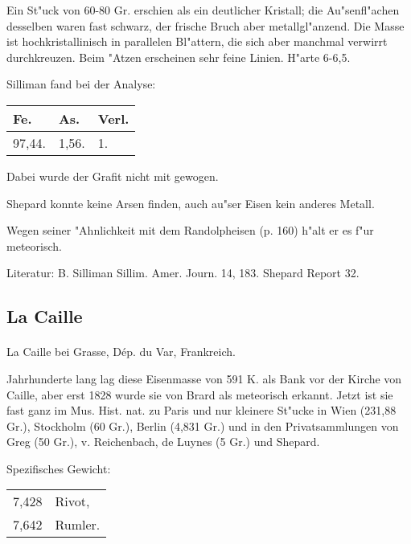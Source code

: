 \documentclass[a4paper, 11pt, oneside]{article}
\begin{document}
Ein St"uck von 60-80 Gr. erschien als ein deutlicher Kristall; die Au"senfl"achen desselben waren fast schwarz, der frische Bruch aber metallgl"anzend. Die Masse ist hochkristallinisch in parallelen Bl"attern, die sich aber manchmal verwirrt durchkreuzen. Beim "Atzen erscheinen sehr feine Linien. H"arte 6-6,5.

Silliman fand bei der Analyse:
\begin{table}[H]
    \centering
    \begin{tabular}{l l l}
        Fe. & As. & Verl. \\ \hline
        97,44. & 1,56. & 1. \\
    \end{tabular}
\end{table}

Dabei wurde der Grafit nicht mit gewogen.

Shepard konnte keine Arsen finden, auch au"ser Eisen kein anderes Metall.

Wegen seiner "Ahnlichkeit mit dem Randolpheisen (p. 160) h"alt er es f"ur meteorisch.

\footnotesize
Literatur: B. Silliman Sillim. Amer. Journ. 14, 183. Shepard Report 32.

\subsection{La Caille}
\normalsize
\paragraph{}
La Caille bei Grasse, Dép. du Var, Frankreich.

Jahrhunderte lang lag diese Eisenmasse von 591 K. als Bank vor der Kirche von Caille, aber erst 1828 wurde sie von Brard als meteorisch erkannt. Jetzt ist sie fast ganz im Mus. Hist. nat. zu Paris und nur kleinere St"ucke in Wien (231,88 Gr.), Stockholm (60 Gr.), Berlin (4,831 Gr.) und in den Privatsammlungen von Greg (50 Gr.), v. Reichenbach, de Luynes (5 Gr.) und Shepard.

Spezifisches Gewicht:  
\begin{table}[!ht]
    \centering
    \begin{tabular}{l l}
        7,428 & Rivot,\\
        7,642 & Rumler.
    \end{tabular}
\end{table}
\end{document}
